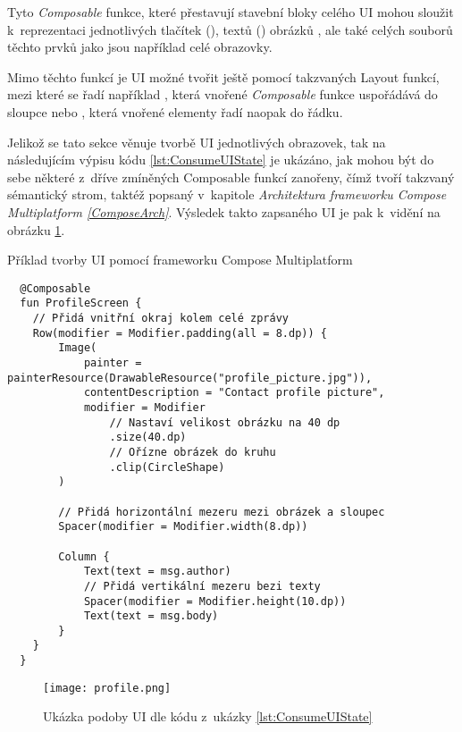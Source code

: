 Tyto \textit{Composable} funkce, které přestavují stavební bloky celého UI mohou sloužit k~reprezentaci jednotlivých tlačítek (), 
textů () obrázků , ale také celých souborů těchto prvků jako jsou například celé obrazovky.

Mimo těchto funkcí je UI možné tvořit ještě pomocí takzvaných Layout funkcí, mezi které se řadí například , která vnořené \textit{Composable}
funkce uspořádává do sloupce nebo , která vnořené elementy řadí naopak do řádku.

Jelikož se tato sekce věnuje tvorbě UI jednotlivých obrazovek, tak na následujícím výpisu kódu \ref{lst:ConsumeUIState} je ukázáno, jak mohou
 být do sebe některé z~dříve zmíněných Composable funkcí zanořeny, čímž tvoří takzvaný sémantický strom, taktéž popsaný v~kapitole 
 \textit{Architektura frameworku Compose Multiplatform \ref{ComposeArch}}. Výsledek takto zapsaného UI je pak k~vidění na obrázku \ref{fig:ProfileScreen}.

\begin{listing}[H]
\caption{Příklad tvorby UI pomocí frameworku Compose Multiplatform}\label{lst:ConsumeUIState}
\begin{verbatim}
  @Composable
  fun ProfileScreen {
    // Přidá vnitřní okraj kolem celé zprávy
    Row(modifier = Modifier.padding(all = 8.dp)) {
        Image(
            painter = painterResource(DrawableResource("profile_picture.jpg")),
            contentDescription = "Contact profile picture",
            modifier = Modifier
                // Nastaví velikost obrázku na 40 dp
                .size(40.dp)
                // Ořízne obrázek do kruhu
                .clip(CircleShape)
        )

        // Přidá horizontální mezeru mezi obrázek a sloupec
        Spacer(modifier = Modifier.width(8.dp))

        Column {
            Text(text = msg.author)
            // Přidá vertikální mezeru bezi texty
            Spacer(modifier = Modifier.height(10.dp))
            Text(text = msg.body)
        }
    }
  }
\end{verbatim}
\end{listing}

\begin{figure}[H]
  \centering
  \texttt{[image: profile.png]}
  \caption{Ukázka podoby UI dle kódu z~ukázky \ref{lst:ConsumeUIState}}
  \label{fig:ProfileScreen}
\end{figure}

